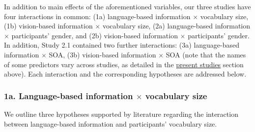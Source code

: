 \documentclass[
  12pt,
  man,floatsintext]{apa7}
\begin{document}
In addition to main effects of the aforementioned variables, our three studies have four interactions in common: (1a) language-based information \(\times\) vocabulary size, (1b) vision-based information \(\times\) vocabulary size, (2a) language-based information \(\times\) participants' gender, and (2b) vision-based information \(\times\) participants' gender. In addition, Study 2.1 contained two further interactions: (3a) language-based information \(\times\) SOA, (3b) vision-based information \(\times\) SOA (note that the names of some predictors vary across studies, as detailed in the \protect\hyperlink{language}{\underline{present studies}} section above). Each interaction and the corresponding hypotheses are addressed below.

\hypertarget{a.-language-based-information-times-vocabulary-size}{%
\subsubsection{\texorpdfstring{1a. Language-based information \(\times\) vocabulary size}{1a. Language-based information \textbackslash times vocabulary size}}\label{a.-language-based-information-times-vocabulary-size}}

We outline three hypotheses supported by literature regarding the interaction between language-based information and participants' vocabulary size.
\end{document}
